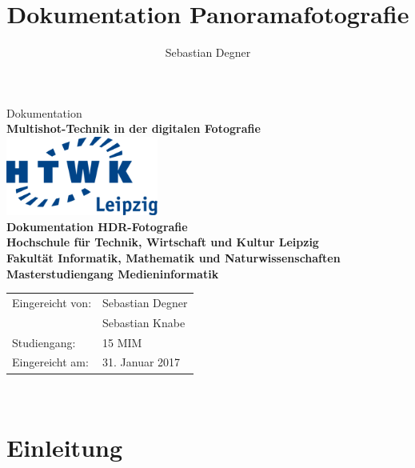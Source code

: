 \documentclass[liststotoc,bibtotoc,fontsize=14pt,]{scrreprt}
\title{Dokumentation Panoramafotografie}
\author{Sebastian Degner}
\begin{document}
	
	\begin{titlepage}
		\begin{center}
			\vspace{2cm}
			Dokumentation\\ \textbf{Multishot-Technik in der digitalen Fotografie}\\ 
			\vspace{2,5cm}
			\includegraphics[width=5cm]{HTWK_Logo_RGB-transparent_250.png}\\
			
			\vspace{2,5cm}
			\huge \textbf{\textsf{Dokumentation HDR-Fotografie}} \\
			\vspace{3cm}
			\fontsize{15}{18} \textbf{Hochschule für Technik, Wirtschaft und Kultur
				Leipzig\\ Fakultät Informatik, Mathematik und Naturwissenschaften\\   Masterstudiengang Medieninformatik}\\
			\vspace{3cm}
		\end{center}
		\normalsize{
			\begin{tabular}{ll}
				Eingereicht von: & {Sebastian Degner} \\
				 & {Sebastian Knabe} \\
				Studiengang: & 15 MIM\\
				Eingereicht am: & 31. Januar 2017 \\
			\end{tabular}\\
		}
		
	\end{titlepage}
	
	\tableofcontents
	\clearpage
	\listoffigures

	\chapter{Einleitung}
	\label{ch:einleitung}
\end{document}
